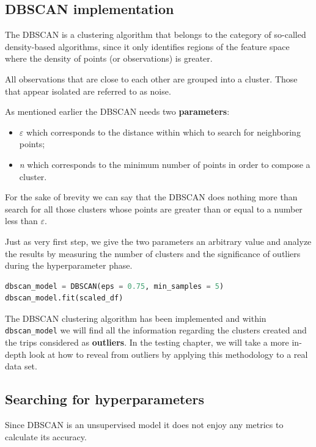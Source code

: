 \subsection{DBSCAN implementation}
The DBSCAN is a clustering algorithm that belongs to the category of so-called density-based algorithms, since it only identifies regions of the feature space where the density of points (or observations) is greater.

All observations that are close to each other are grouped into a cluster. Those that appear isolated are referred to as noise.

As mentioned earlier the DBSCAN needs two \textbf{parameters}:

\begin{itemize}
\item $\varepsilon$ which corresponds to the distance within which to search for neighboring points;
\item \textit{n} which corresponds to the minimum number of points in order to compose a cluster.
\end{itemize}

For the sake of brevity we can say that the DBSCAN does nothing more than search for all those clusters whose points are greater than or equal to a number less than $\varepsilon$.

Just as very first step, we give the two parameters an arbitrary value and analyze the results by measuring the number of clusters and the significance of outliers during the hyperparameter phase.

\begin{lstlisting}[language=Python]
dbscan_model = DBSCAN(eps = 0.75, min_samples = 5)
dbscan_model.fit(scaled_df)
\end{lstlisting}

The DBSCAN clustering algorithm has been implemented and within \verb|dbscan_model| we will find all the information regarding the clusters created and the trips considered as \textbf{outliers}. In the testing chapter, we will take a more in-depth look at how to reveal from outliers by applying this methodology to a real data set.

\subsection{Searching for hyperparameters}

Since DBSCAN is an unsupervised model it does not enjoy any metrics to calculate its accuracy.

